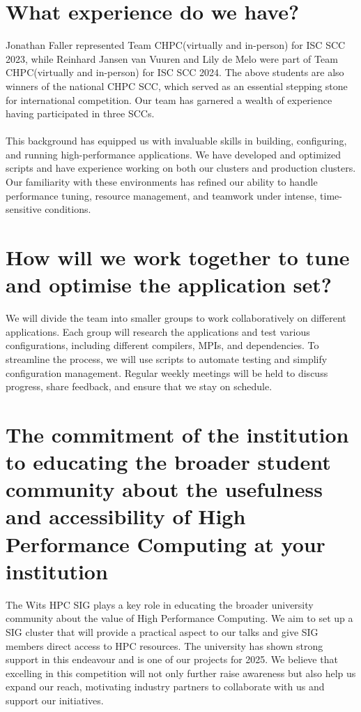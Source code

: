 \documentclass[10pt, onecolumn]{IEEEtran}
\begin{document}
\section{What experience do we have?}
\noindent
Jonathan Faller represented Team CHPC(virtually and in-person) for ISC SCC 2023, while Reinhard Jansen van Vuuren and Lily de Melo were part of Team CHPC(virtually and in-person) for ISC SCC 2024. The above students are also winners of the national CHPC SCC, which served as an essential stepping stone for international competition. Our team has garnered a wealth of experience having participated in three SCCs. 
\\\\
This background has equipped us with invaluable skills in building, configuring, and running high-performance applications. We have developed and optimized scripts and have experience working on both our clusters and production clusters. Our familiarity with these environments has refined our ability to handle performance tuning, resource management, and teamwork under intense, time-sensitive conditions. 
\section{How will we work together to tune and optimise the application set?}
\noindent
We will divide the team into smaller groups to work collaboratively on different applications. Each group will research the applications and test various configurations, including different compilers, MPIs, and dependencies. To streamline the process, we will use scripts to automate testing and simplify configuration management. Regular weekly meetings will be held to discuss progress, share feedback, and ensure that we stay on schedule.
\section{The commitment of the institution to educating the broader student community about the usefulness and accessibility of High Performance Computing at your institution}
\noindent
The Wits HPC SIG plays a key role in educating the broader university community about the value of High Performance Computing. We aim to set up a SIG cluster that will provide a practical aspect to our talks and give SIG members direct access to HPC resources. The university has shown strong support in this endeavour and is one of our projects for 2025. We believe that excelling in this competition will not only further raise awareness but also help us expand our reach, motivating industry partners to collaborate with us and support our initiatives.
\end{document}
